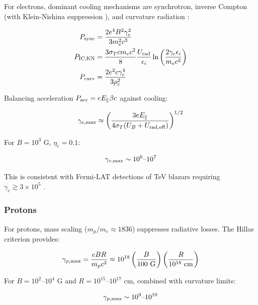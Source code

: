 \documentclass[twocolumn,superscriptaddress,prd,nofootinbib]{revtex4-2}
\begin{document}
For electrons, dominant cooling mechanisms are synchrotron, inverse Compton (with Klein-Nishina suppression \citep{Moderski2005,BlumenthalGould1970}), and curvature radiation \citep{Jackson1999}:

\begin{align}
P_{\rm sync} &= \frac{2e^4 B^2 \gamma_e^2}{3m_e^2 c^3} \label{eq:sync_cooling}\\
P_{\rm IC,KN} &= \frac{3\sigma_T c m_e c^2}{8} \frac{U_{\rm rad}}{\epsilon_i} \ln\left(\frac{2\gamma_e \epsilon_i}{m_e c^2}\right) \label{eq:IC_KN_cooling}\\
P_{\rm curv} &= \frac{2e^2 c \gamma_e^4}{3\rho_c^2} \label{eq:curvature}
\end{align}

Balancing acceleration $P_{\rm acc} = e E_\parallel \beta c$ against cooling:

\begin{equation}
\gamma_{e,\rm max} \approx \left( \frac{3 e E_\parallel}{4\sigma_T (U_B + U_{\rm rad,eff})} \right)^{1/2}
\label{eq:gamma_e_max}
\end{equation}

For $B = 10^3$ G, $\eta_e = 0.1$:

\begin{equation}
\gamma_{e,\rm max} \sim 10^6\text{--}10^7
\label{eq:gamma_e_result}
\end{equation}

This is consistent with Fermi-LAT detections of TeV blazars requiring $\gamma_e \gtrsim 3 \times 10^5$ \citep{Ajello2017}.

\subsubsection{Protons}

For protons, mass scaling ($m_p/m_e \approx 1836$) suppresses radiative losses. The Hillas criterion \citep{Hillas1984} provides:

\begin{equation}
\gamma_{p,\rm max} = \frac{eBR}{m_p c^2} \approx 10^{18} \left(\frac{B}{100 \text{ G}}\right) \left(\frac{R}{10^{18} \text{ cm}}\right)
\label{eq:Hillas}
\end{equation}

For $B = 10^2$--$10^4$ G and $R = 10^{15}$--$10^{17}$ cm, combined with curvature limits:

\begin{equation}
\gamma_{p,\rm max} \sim 10^9\text{--}10^{10}
\label{eq:gamma_p_result}
\end{equation}
\end{document}
